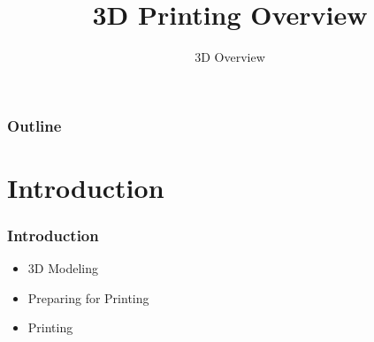 \documentclass[english,10pt]{beamer}
\title{3D Printing Overview}
\subtitle{3D Overview}
\begin{document}
\begin{frame}
  \titlepage
\end{frame}

\begin{frame}
  \frametitle{Outline}
  \tableofcontents
\end{frame}

\section{Introduction}
\begin{frame}
  \frametitle{Introduction}
  \begin{itemize}
    \item 3D Modeling
    \item Preparing for Printing
    \item Printing
  \end{itemize}
\end{frame}
\end{document}
